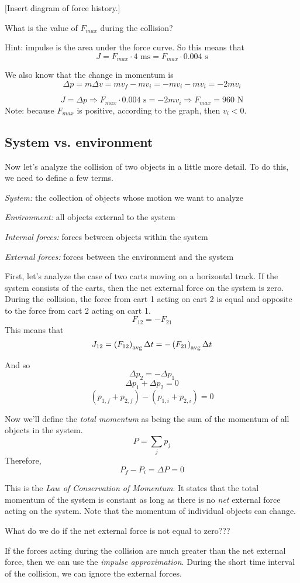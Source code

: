 [Insert diagram of force history.]
\vspace{5cm}

What is the value of $F_{max}$ during the collision?

Hint: impulse is the area under the force curve. So this means that 
$$J=F_{max}\cdot 4\mbox{ ms}=F_{max}\cdot 0.004\mbox{ s}$$

We also know that the change in momentum is 
$$\Delta{p}=m\Delta{v}=mv_f-mv_i=-mv_i-mv_i=-2mv_i$$

$$J=\Delta{p}\Rightarrow F_{max}\cdot 0.004\mbox{ s}=-2mv_i\Rightarrow F_{max}=960\mbox{ N}$$
Note: because $F_{max}$ is positive, according to the graph, then $v_i<0$.

\subsection{System vs. environment}
Now let's analyze the collision of two objects in a little more detail. To do this, we need to define a few terms.

\textit{System:} the collection of objects whose motion we want to analyze

\textit{Environment:} all objects external to the system

\textit{Internal forces:} forces between objects within the system

\textit{External forces:} forces between the environment and the system

First, let's analyze the case of two carts moving on a horizontal track. If the system consists of the carts, then the net external force on the system is zero. During the collision, the force from cart 1 acting on cart 2 is equal and opposite to the force from cart 2 acting on cart 1.
$$F_{12}=-F_{21}$$
This means that
$$J_{12}=\left(F_{12}\right)_{\rm avg}\Delta{t}=-\left(F_{21}\right)_{\rm avg}\Delta{t}$$

And so
$$\Delta p_2 = -\Delta p_1$$
$$\Delta p_1 + \Delta p_2 = 0$$
$$(p_{1,f}+p_{2,f})-(p_{1,i}+p_{2,i})=0$$

Now we'll define the \textit{total momentum} as being the sum of the momentum of all objects in the system.
$$P=\sum_j p_j$$
Therefore,
$$P_f-P_i=\Delta P = 0$$

This is the \textit{Law of Conservation of Momentum}. It states that the total momentum of the system is constant as long as there is no \textit{net} external force acting on the system. Note that the momentum of individual objects can change.

What do we do if the net external force is not equal to zero???

If the forces acting during the collision are much greater than the net external force, then we can use the \textit{impulse approximation}. During the short time interval of the collision, we can ignore the external forces.



\clearpage
